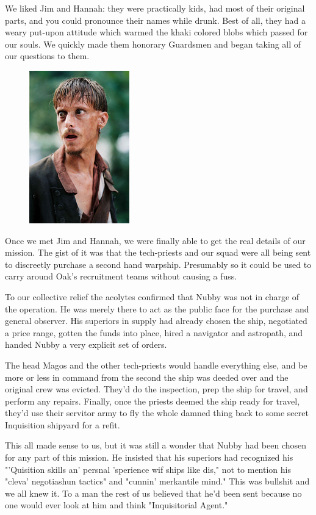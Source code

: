 We liked Jim and Hannah: 
they were practically kids, had most of their original parts, and you could pronounce their names while drunk. 
Best of all, they had a weary put-upon attitude which warmed the khaki colored blobs which passed for our souls. 
We quickly made them honorary Guardsmen and began taking all of our questions to them.

\begin{figure}
	\begin{center}
		\includegraphics[width=\figwidth]{pics/7/4.png}
	\end{center}
\end{figure}
Once we met Jim and Hannah, we were finally able to get the real details of our mission. 
The gist of it was that the tech-priests and our squad were all being sent to discreetly purchase a second hand warpship. 
Presumably so it could be used to carry around Oak’s recruitment teams without causing a fuss.

To our collective relief the acolytes confirmed that Nubby was not in charge of the operation. 
He was merely there to act as the public face for the purchase and general observer. 
His superiors in supply had already chosen the ship, negotiated a price range, gotten the funds into place, hired a navigator and astropath, and handed Nubby a very explicit set of orders. 


The head Magos and the other tech-priests would handle everything else, and be more or less in command from the second the ship was deeded over and the original crew was evicted. 
They’d do the inspection, prep the ship for travel, and perform any repairs. 
Finally, once the priests deemed the ship ready for travel, they’d use their servitor army to fly the whole damned thing back to some secret Inquisition shipyard for a refit.

This all made sense to us, but it was still a wonder that Nubby had been chosen for any part of this mission. 
He insisted that his superiors had recognized his "'Quisition skills an' persnal 'sperience wif ships like dis," not to mention his "cleva' negotiashun tactics" and "cunnin' merkantile mind." This was bullshit and we all knew it. 
To a man the rest of us believed that he’d been sent because no one would ever look at him and think "Inquisitorial Agent." 

